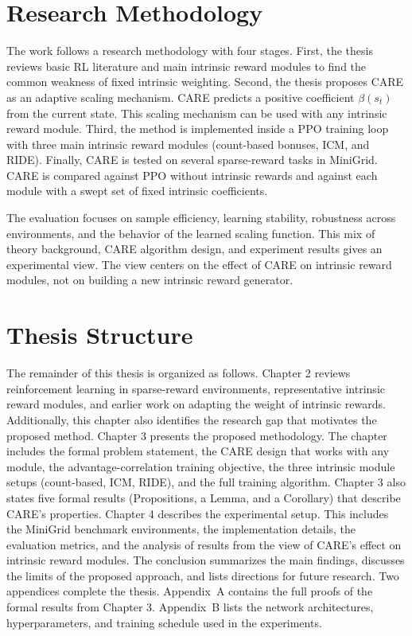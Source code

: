 \section{Research Methodology}
The work follows a research methodology with four stages. First, the thesis reviews basic RL literature and main intrinsic reward modules to find the common weakness of fixed intrinsic weighting. Second, the thesis proposes CARE as an adaptive scaling mechanism. CARE predicts a positive coefficient $\beta(s_t)$ from the current state. This scaling mechanism can be used with any intrinsic reward module. Third, the method is implemented inside a PPO training loop with three main intrinsic reward modules (count-based bonuses, ICM, and RIDE). Finally, CARE is tested on several sparse-reward tasks in MiniGrid. CARE is compared against PPO without intrinsic rewards and against each module with a swept set of fixed intrinsic coefficients.

The evaluation focuses on sample efficiency, learning stability, robustness across environments, and the behavior of the learned scaling function. This mix of theory background, CARE algorithm design, and experiment results gives an experimental view. The view centers on the effect of CARE on intrinsic reward modules, not on building a new intrinsic reward generator.

\section{Thesis Structure}
The remainder of this thesis is organized as follows. Chapter 2 reviews reinforcement learning in sparse-reward environments, representative intrinsic reward modules, and earlier work on adapting the weight of intrinsic rewards. Additionally, this chapter also identifies the research gap that motivates the proposed method. Chapter 3 presents the proposed methodology. The chapter includes the formal problem statement, the CARE design that works with any module, the advantage-correlation training objective, the three intrinsic module setups (count-based, ICM, RIDE), and the full training algorithm. Chapter 3 also states five formal results (Propositions, a Lemma, and a Corollary) that describe CARE's properties. Chapter 4 describes the experimental setup. This includes the MiniGrid benchmark environments, the implementation details, the evaluation metrics, and the analysis of results from the view of CARE's effect on intrinsic reward modules. The conclusion summarizes the main findings, discusses the limits of the proposed approach, and lists directions for future research. Two appendices complete the thesis. Appendix~A contains the full proofs of the formal results from Chapter 3. Appendix~B lists the network architectures, hyperparameters, and training schedule used in the experiments.
